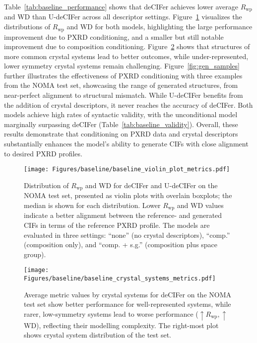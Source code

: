 Table~\ref{tab:baseline_performance} shows that deCIFer achieves lower average $R_{\mathrm{wp}}$ and WD than U-deCIFer across all descriptor settings. Figure~\ref{fig:violinplot_baseline} visualizes the distributions of $R_{\mathrm{wp}}$ and WD for both models, highlighting the large performance improvement due to PXRD conditioning, and a smaller but still notable improvement due to composition conditioning. Figure~\ref{fig:barplot_baseline} shows that structures of more common crystal systems lead to better outcomes, while under-represented, lower symmetry crystal systems remain challenging. Figure~\ref{fig:gen_samples} further illustrates the effectiveness of PXRD conditioning with three examples from the NOMA test set, showcasing the range of generated structures, from near-perfect alignment to structural mismatch. While U-deCIFer benefits from the addition of crystal descriptors, it never reaches the accuracy of deCIFer. Both models achieve high rates of syntactic validity, with the unconditional model marginally surpassing deCIFer (Table~\ref{tab:baseline_validity}). Overall, these results demonstrate that conditioning on PXRD data and crystal descriptors substantially enhances the model's ability to generate CIFs with close alignment to desired PXRD profiles.

\begin{figure}[t!]
\begin{center}
\centerline{\texttt{[image: Figures/baseline/baseline\_violin\_plot\_metrics.pdf]}}
\caption{Distribution of $R_{\mathrm{wp}}$ and WD for deCIFer and U-deCIFer on the NOMA test set, presented as violin plots with overlain boxplots; the median is shown for each distribution. Lower $R_{\mathrm{wp}}$ and WD values indicate a better alignment between the reference- and generated CIFs in terms of the reference PXRD profile. The models are evaluated in three settings: ``none” (no crystal descriptors), ``comp.” (composition only), and ``comp. + s.g.” (composition plus space group).}
\label{fig:violinplot_baseline}
\end{center}
\vskip -0.2in
\end{figure}

\begin{figure}[t!]
\begin{center}
\centerline{\texttt{[image: Figures/baseline/baseline\_crystal\_systems\_metrics.pdf]}}
\caption{
Average metric values by crystal systems for deCIFer on the NOMA test set show better performance for well-represented systems, while rarer, low-symmetry systems lead to worse performance ($\uparrow R_{\mathrm{wp}}, \uparrow$WD), reflecting their modelling complexity. The right-most plot shows crystal system distribution of the test set.
}
\label{fig:barplot_baseline}
\end{center}
\vskip -0.2in
\end{figure}


